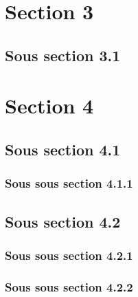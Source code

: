\section{Section 3}
\lipsum[1][1-3]

\subsection{Sous section 3.1}
\lipsum[1][4-6]

\section{Section 4}
\lipsum[1][1-3]

\subsection{Sous section 4.1}
\subsubsection{Sous sous section 4.1.1}
\lipsum[1][4-6]

\subsection{Sous section 4.2}
\subsubsection{Sous sous section 4.2.1}
\lipsum[1][4-6]
\subsubsection{Sous sous section 4.2.2}
\lipsum[2][4-6]
